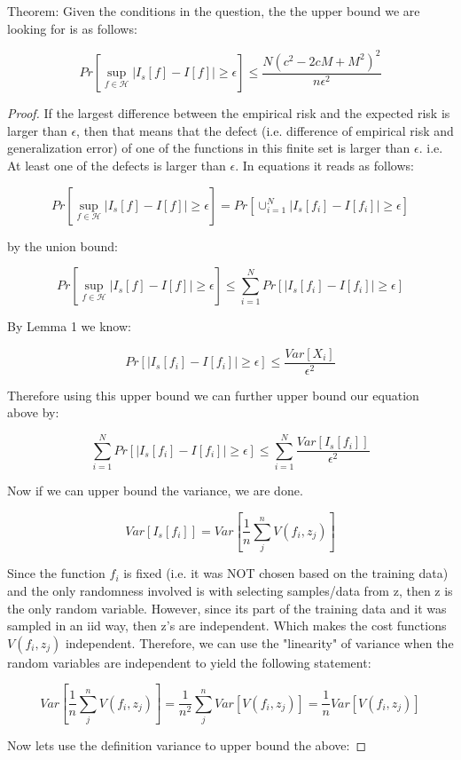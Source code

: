\documentclass[12pt]{report}
\begin{document}
Theorem: Given the conditions in the question, the the upper bound we are looking for is as follows:

$$Pr[ \sup\limits_{f \in \mathcal{H}}  | I_s[f] - I[f] | \geq \epsilon] \leq \frac{N(c^2-2cM+M^2)^2}{n \epsilon^2}$$
\begin{proof}

If the largest difference between the empirical risk and the expected risk is larger than $\epsilon$, then that means that the defect (i.e. difference of empirical risk and generalization error) of one of the functions in this finite set is larger than $\epsilon.$ 
i.e. At least one of the defects is larger than $\epsilon$. In equations it reads as follows:

$$Pr[ \sup\limits_{f \in \mathcal{H}}  | I_s[f] - I[f] | \geq \epsilon] = Pr[\cup^{N}_{i=1} | I_s[f_i] - I[f_i] | \geq \epsilon] $$

by the union bound:

$$Pr[ \sup\limits_{f \in \mathcal{H}}  | I_s[f] - I[f] | \geq \epsilon]  \leq \sum^{N}_{i=1} Pr[| I_s[f_i] - I[f_i] | \geq \epsilon] $$

By Lemma 1 we know:

$$ Pr[ | I_s[f_i] - I[f_i] | \geq \epsilon] \leq \frac{ Var[X_i] }{ \epsilon^2 } $$

Therefore using this upper bound we can further upper bound our equation above by:

$$ \sum^{N}_{i=1} Pr[| I_s[f_i] - I[f_i] | \geq \epsilon] \leq \sum^{N}_{i=1} \frac{ Var[I_s[f_i]] }{ \epsilon^2 }$$

Now if we can upper bound the variance, we are done.

$$ Var[I_s[f_i]] = Var[\frac{1}{n} \sum^n_j V(f_i,z_j)]$$

Since the function $f_i$ is fixed (i.e. it was NOT chosen based on the training data) and the only randomness involved is with selecting samples/data from z, then z is the only random variable. However, since its part of the training data and it was sampled in an iid way, then z's are independent. Which makes the cost functions $V(f_i,z_j)$ independent. Therefore, we can use the "linearity" of variance when the random variables are independent to yield the following statement:

$$ Var[\frac{1}{n} \sum^n_j V(f_i,z_j)] = \frac{1}{n^2} \sum^n_j Var[V(f_i,z_j)] = \frac{1}{n}Var[V(f_i,z_j)]  $$

Now lets use the definition variance to upper bound the above:


\end{proof}
\end{document}
